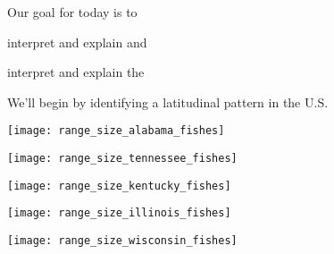 \documentclass[t]{beamer}
\begin{document}

\begin{frame}[t,plain]{Our goal for today is to }

	
	\hangpara interpret and explain  and
	
	\hangpara interpret and explain the 
	
	
	\hangpara We'll begin by identifying a latitudinal pattern in the U.S.

\end{frame}


\begin{frame}[t,plain]
	\begin{center}
		\texttt{[image: range\_size\_alabama\_fishes]}
	\end{center}
\end{frame}

\begin{frame}[t,plain]
	\begin{center}
		\texttt{[image: range\_size\_tennessee\_fishes]}
	\end{center}
\end{frame}

\begin{frame}[t,plain]
	\begin{center}
		\texttt{[image: range\_size\_kentucky\_fishes]}
	\end{center}
\end{frame}

\begin{frame}[t,plain]
	\begin{center}
		\texttt{[image: range\_size\_illinois\_fishes]}
	\end{center}
\end{frame}

\begin{frame}[t,plain]
	\begin{center}
		\texttt{[image: range\_size\_wisconsin\_fishes]}
	\end{center}
\end{frame}
\end{document}
